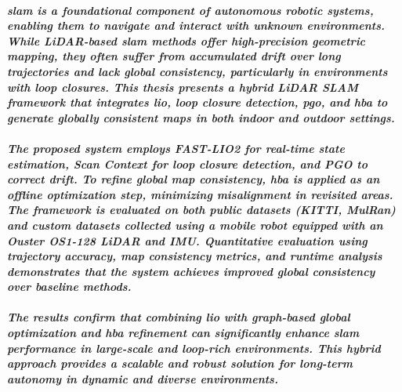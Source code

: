 \paragraph{\textit{\gls{slam} is a foundational component of autonomous robotic systems, enabling them to navigate and interact with unknown environments. While LiDAR-based \gls{slam} methods offer high-precision geometric mapping, they often suffer from accumulated drift over long trajectories and lack global consistency, particularly in environments with loop closures. This thesis presents a hybrid LiDAR SLAM framework that integrates \gls{lio}, loop closure detection, \gls{pgo}, and \gls{hba} to generate globally consistent maps in both indoor and outdoor settings.}}

\paragraph{\textit{The proposed system employs FAST-LIO2 for real-time state estimation, Scan Context for loop closure detection, and PGO to correct drift. To refine global map consistency, \gls{hba} is applied as an offline optimization step, minimizing misalignment in revisited areas. The framework is evaluated on both public datasets (KITTI, MulRan) and custom datasets collected using a mobile robot equipped with an Ouster OS1-128 LiDAR and IMU. Quantitative evaluation using trajectory accuracy, map consistency metrics, and runtime analysis demonstrates that the system achieves improved global consistency over baseline methods.}}

\paragraph{\textit{The results confirm that combining \gls{lio} with graph-based global optimization and \gls{hba} refinement can significantly enhance \gls{slam} performance in large-scale and loop-rich environments. This hybrid approach provides a scalable and robust solution for long-term autonomy in dynamic and diverse environments.}}
